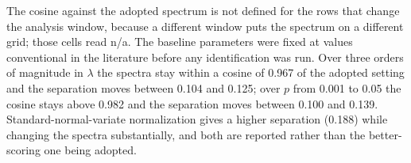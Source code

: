 \begin{table}[htbp]
\begin{flushleft}\footnotesize The cosine against the adopted spectrum is not defined for the rows that change the analysis window, because a different window puts the spectrum on a different grid; those cells read n/a. The baseline parameters were fixed at values conventional in the literature before any identification was run. Over three orders of magnitude in $\lambda$ the spectra stay within a cosine of 0.967 of the adopted setting and the separation moves between 0.104 and 0.125; over $p$ from 0.001 to 0.05 the cosine stays above 0.982 and the separation moves between 0.100 and 0.139. Standard-normal-variate normalization gives a higher separation (0.188) while changing the spectra substantially, and both are reported rather than the better-scoring one being adopted.\end{flushleft}
\end{table}
